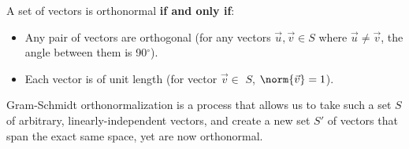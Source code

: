 \pgfplotsset{width=7cm,compat=1.16}

% 



A set of vectors is orthonormal \textbf{if and only if}:
\begin{itemize}
    \item Any pair of vectors are orthogonal (for any vectors $\vec{u}, \vec{v} \in S$ where $\vec{u} \neq \vec{v}$, the angle between them is 90$^\circ$).
    \item Each vector is of unit length (for vector $\vec{v} \in $ $S$, $\norm{\vec{v}} = 1$).
\end{itemize}

Gram-Schmidt orthonormalization is a process that allows us to take such a set $S$ of arbitrary, linearly-independent vectors, and create a new set $S'$ of vectors that span the exact same space, yet are now orthonormal.

